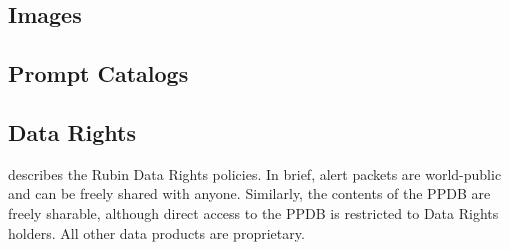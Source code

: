 \subsection{Images} \label{sec:images}

\subsection{Prompt Catalogs} \label{sec:catalogs}


\subsection{Data Rights} \label{sec:data-rights}

\citet{RDO-013} describes the Rubin Data Rights policies.
In brief, alert packets are world-public and can be freely shared with anyone.
Similarly, the contents of the PPDB are freely sharable, although direct access to the PPDB is restricted to Data Rights holders.
All other data products are proprietary.